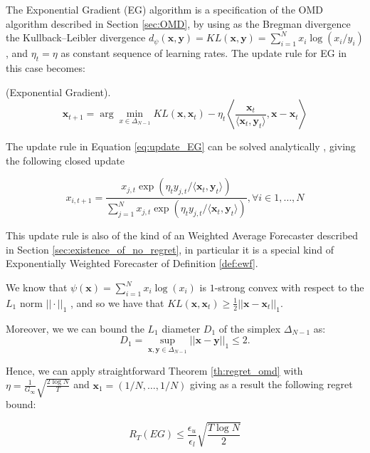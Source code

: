 The Exponential Gradient (EG) algorithm is a specification of the OMD algorithm described in Section \ref{sec:OMD}, by using as the Bregman divergence the Kullback–Leibler divergence $d_\psi(\mathbf x,\mathbf y)=KL(\mathbf x,\mathbf y)=\sum\limits_{i=1}^Nx_i\log(x_i/y_i)$, and $\eta_t=\eta$ as constant sequence of learning rates. The update rule for EG in this case becomes:

\begin{definition}(Exponential Gradient).
\begin{equation}\label{eq:update_EG}
\mathbf x_{t+1}=\arg\min\limits_{x\in\Delta_{N-1}} KL(\mathbf x,\mathbf x_t)-\eta_t\left\langle \frac{\mathbf x_t}{\langle \mathbf x_t,\mathbf y_t\rangle},\mathbf x-\mathbf x_t\right\rangle
\end{equation}
\end{definition}

The update rule in Equation \eqref{eq:update_EG} can be solved analytically \cite{helmbold1998line}, giving the following closed update 

\begin{equation}\label{eq:update_EG_closed}
x_{i,t+1}=\frac{x_{j,t}\exp\left(\eta_t{y_{j,t}}/\langle\mathbf x_t,\mathbf y_t\rangle\right)}{\sum\limits_{j=1}^Nx_{j,t}\exp\left(\eta_t{y_{j,t}}/\langle\mathbf x_t,\mathbf y_t\rangle\right)}, \forall i\in1,\ldots,N
\end{equation}

This update rule is also of the kind of an Weighted Average Forecaster described in Section \ref{sec:existence_of_no_regret}, in particular it is a special kind of Exponentially Weighted Forecaster of Definition \ref{def:ewf}.

We know that $\psi(\mathbf x)=\sum\limits_{i=1}^Nx_i\log(x_i)$ is $1$-strong convex with respect to the $L_1$ norm $||\cdot||_1$ \cite{shalev2007online}, and so we have that $KL(\mathbf x,\mathbf x_t)\ge\frac{1}{2}||\mathbf x-\mathbf x_t||_1$.

Moreover, we we can bound the $L_1$ diameter $D_1$ of the simplex $\Delta_{N-1}$ as: 
$$D_1=\sup\limits_{\mathbf x,\mathbf y\in\Delta_{N-1}}||\mathbf x-\mathbf y||_1\le2.$$

Hence, we can apply straightforward Theorem \ref{th:regret_omd} with $\eta=\frac{1}{G_\infty}\sqrt{\frac{2\log N}{T}}$ and $\mathbf x_1=(1/N,\ldots,1/N)$ giving as a result the following regret bound:

\begin{equation}
R_T(EG)\le \frac{\epsilon_u}{\epsilon_l}\sqrt{\frac{T\log N}{2}}
\end{equation}


